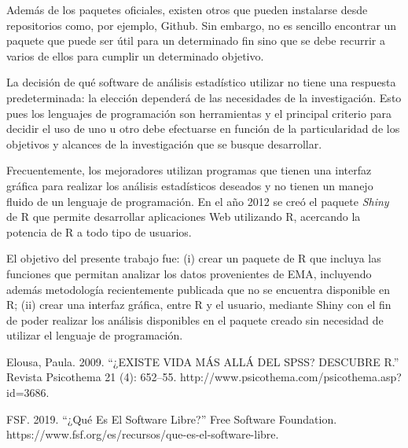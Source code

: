 Además de los paquetes oficiales, existen otros que pueden instalarse desde repositorios como, por ejemplo, Github. Sin embargo, no es sencillo encontrar un paquete que puede ser útil para un determinado fin sino que se debe recurrir a varios de ellos para cumplir un determinado objetivo. 

La decisión de qué software de análisis estadístico utilizar no tiene una respuesta predeterminada: la elección dependerá de las necesidades de la investigación. Esto pues los lenguajes de programación son herramientas y el principal criterio para decidir el uso de uno u otro debe efectuarse en función de la particularidad de los objetivos y alcances de la investigación que se busque desarrollar.

Frecuentemente, los mejoradores utilizan programas que tienen una interfaz gráfica para realizar los análisis estadísticos deseados y no tienen un manejo fluido de un lenguaje de programación. En el año 2012 se creó el paquete \emph{Shiny} de R que permite desarrollar aplicaciones Web utilizando R, acercando la potencia de R a todo tipo de usuarios.


El objetivo del presente trabajo fue: (i) crear un paquete de R que incluya las funciones que permitan analizar los datos provenientes de EMA, incluyendo además metodología recientemente publicada que no se encuentra disponible en R; (ii) crear una interfaz gráfica, entre R y el usuario, mediante Shiny con el fin de poder realizar los análisis disponibles en el paquete creado sin necesidad de utilizar el lenguaje de programación.



Elousa, Paula. 2009. “¿EXISTE VIDA MÁS ALLÁ DEL SPSS? DESCUBRE R.” Revista Psicothema 21 (4): 652–55. http://www.psicothema.com/psicothema.asp?id=3686.

FSF. 2019. “¿Qué Es El Software Libre?” Free Software Foundation. https://www.fsf.org/es/recursos/que-es-el-software-libre.